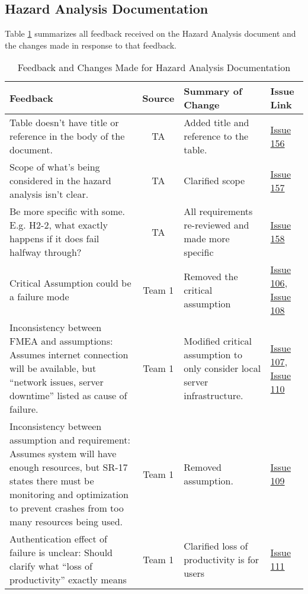 \documentclass{article}
\begin{document}
\subsection{Hazard Analysis Documentation}
Table \ref{table:HA} summarizes all feedback received on the Hazard Analysis
document and the changes made in response to that feedback.
\begin{table}[H]
\centering
\begin{tabularx}{\textwidth}{|X|c|X|p{1.5cm}|}
    \hline
    \textbf{Feedback} & \textbf{Source} & \textbf{Summary of Change}
    & \textbf{Issue Link} \\
    \hline
    Table doesn't have title or reference in the body of the document. & TA
    & Added title and reference to the table. &
    \href{https://github.com/SumanyaG/Alkalytics/issues/156}{Issue 156} \\
    \hline
    Scope of what's being considered in the hazard analysis isn't clear. & TA &
    Clarified scope &
    \href{https://github.com/SumanyaG/Alkalytics/issues/157}{Issue 157} \\
    \hline
    Be more specific with some. E.g. H2-2, what exactly happens if it does fail
    halfway through? & TA & All requirements re-reviewed and made more specific
    & \href{https://github.com/SumanyaG/Alkalytics/issues/158}{Issue 158} \\
    \hline
    Critical Assumption could be a failure mode & Team 1 & Removed the critical
    assumption & \href{https://github.com/SumanyaG/Alkalytics/issues/106}{Issue
    106}, \newline
    \href{https://github.com/SumanyaG/Alkalytics/issues/108}{Issue 108} \\
    \hline
    Inconsistency between FMEA and assumptions: Assumes internet connection
    will be available, but ``network issues, server downtime'' listed as cause
    of failure. & Team 1 & Modified critical assumption to only consider local
    server infrastructure. &
    \href{https://github.com/SumanyaG/Alkalytics/issues/107}{Issue
    107}, \newline
    \href{https://github.com/SumanyaG/Alkalytics/issues/110}{Issue 110} \\
    \hline
    Inconsistency between assumption and requirement: Assumes system will have
    enough resources, but SR-17 states there must be monitoring and optimization
    to prevent crashes from too many resources being used. & Team 1 & Removed
    assumption. & \href{https://github.com/SumanyaG/Alkalytics/issues/109}{Issue
    109} \\
    \hline
    Authentication effect of failure is unclear: Should clarify what ``loss of
    productivity'' exactly means & Team 1 & Clarified loss of productivity is
    for users & \href{https://github.com/SumanyaG/Alkalytics/issues/111}{Issue
    111} \\
    \hline
\end{tabularx}
\caption{Feedback and Changes Made for Hazard Analysis Documentation}
\label{table:HA}
\end{table}
\end{document}
